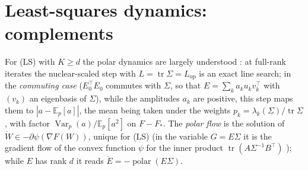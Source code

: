 \documentclass[11pt]{article}
\newcommand{\E}{\mathbb{E}}
\newcommand{\abs}[1]{\left|#1\right|}
\newcommand{\tr}{\operatorname{tr}}
\newcommand{\polar}{\operatorname{polar}}
\newcommand{\Var}{\operatorname{Var}}
\newcommand{\Lop}{L_{\mathrm{op}}}
\begin{document}
\section{Least-squares dynamics: complements}\label{sec:ls}

For (LS) with $K\ge d$ the polar dynamics are largely understood \cite{shulgin2026quadratic,vasudeva2025muon}: at
full-rank iterates the nuclear-scaled step with $L=\tr\Sigma=\Lop$ is an exact line search; in the \emph{commuting
case} ($E_0^\top E_0$ commutes with $\Sigma$, so that $E=\sum_ka_ku_kv_k^\top$ with $(v_k)$ an eigenbasis of
$\Sigma$), while the amplitudes $a_k$ are positive, this step maps them to $\abs{a-\E_p[a]}$, the mean being taken
under the weights $p_k=\lambda_k(\Sigma)/\tr\Sigma$, with factor $\Var_p(a)/\E_p[a^2]$ on $F-F_\ast$. The
\emph{polar flow} is the solution of
$\dot W\in-\partial\psi(\nabla F(W))$, unique for (LS) (in the variable $G=E\Sigma$ it is the gradient flow of the
convex function $\psi$ for the inner product $\tr(A\Sigma^{-1}B^\top)$ \cite{brezis1973operateurs}); while $E$ has
rank $d$ it reads $\dot E=-\polar(E\Sigma)$.
\end{document}
